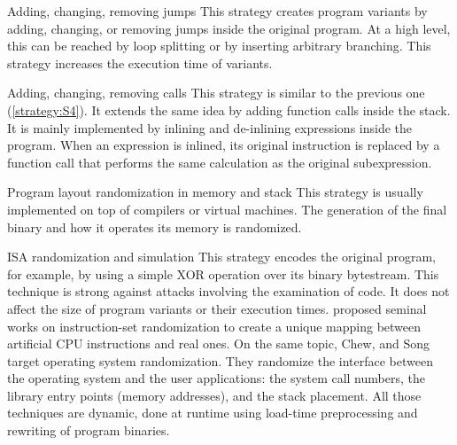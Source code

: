 \begin{strategy}{Adding, changing, removing jumps}
    \label{strategy:S4}
    \normalfont
    This strategy creates program variants by adding, changing, or removing jumps inside the original program. At a high level, this can be reached by loop splitting or by inserting arbitrary branching. This strategy increases the execution time of variants.
\end{strategy}


\begin{strategy}{Adding, changing, removing calls}
    \label{strategy:S5}
    \normalfont
    This strategy is similar to the previous one (\autoref{strategy:S4}). It extends the same idea by adding function calls inside the stack. It is mainly implemented by inlining and de-inlining expressions inside the program. When an expression is inlined, its original instruction is replaced by a function call that performs the same calculation as the original subexpression.
\end{strategy}


\begin{strategy}{Program layout randomization in memory and stack}
    \label{strategy:S7}
    \normalfont
    This strategy is usually implemented on top of compilers or virtual machines. The generation of the final binary and how it operates its memory is randomized.  %
\end{strategy}


\begin{strategy}{ISA randomization and simulation}
    \label{strategy:S8}
    \normalfont
    This strategy encodes the original program, for example, by using a simple XOR operation over its binary bytestream. This technique is strong against attacks involving the examination of code. It does not affect the size of program variants or their execution times.
     \cite{Kc03,barrantes2003randomized} proposed seminal works on instruction-set randomization 
    to create a unique mapping between artificial CPU instructions and real ones.
    On the same topic, Chew, and Song \cite{Chew02mitigatingbuffer} target operating system randomization. They randomize the interface between the operating system and the user applications: the system call numbers, the library entry points (memory addresses), and the stack placement. All those techniques are dynamic, done at runtime using load-time preprocessing and rewriting of program binaries. 
    
\end{strategy}


